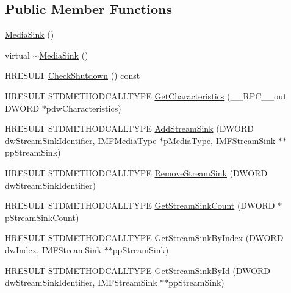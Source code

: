 \subsection*{Public Member Functions}
\begin{DoxyCompactItemize}
\item 
\hyperlink{class_time_stamp_1_1_web_cam_sec_extensions_1_1_media_sink_a26ccc9b7b50079c5fd1309d56a31a088}{Media\+Sink} ()
\item 
virtual \hyperlink{class_time_stamp_1_1_web_cam_sec_extensions_1_1_media_sink_ada06a5ae3a23aa7283f480d4da9e413a}{$\sim$\+Media\+Sink} ()
\item 
H\+R\+E\+S\+U\+LT \hyperlink{class_time_stamp_1_1_web_cam_sec_extensions_1_1_media_sink_a912634cd2c138a78ec02a21ba72b1cea}{Check\+Shutdown} () const
\item 
H\+R\+E\+S\+U\+LT S\+T\+D\+M\+E\+T\+H\+O\+D\+C\+A\+L\+L\+T\+Y\+PE \hyperlink{class_time_stamp_1_1_web_cam_sec_extensions_1_1_media_sink_a4573948e4208bfc947eef15c0d8b72f7}{Get\+Characteristics} (\+\_\+\+\_\+\+R\+P\+C\+\_\+\+\_\+out D\+W\+O\+RD $\ast$pdw\+Characteristics)
\item 
H\+R\+E\+S\+U\+LT S\+T\+D\+M\+E\+T\+H\+O\+D\+C\+A\+L\+L\+T\+Y\+PE \hyperlink{class_time_stamp_1_1_web_cam_sec_extensions_1_1_media_sink_a97556e012a126b54224c4f717c4e2c61}{Add\+Stream\+Sink} (D\+W\+O\+RD dw\+Stream\+Sink\+Identifier, I\+M\+F\+Media\+Type $\ast$p\+Media\+Type, I\+M\+F\+Stream\+Sink $\ast$$\ast$pp\+Stream\+Sink)
\item 
H\+R\+E\+S\+U\+LT S\+T\+D\+M\+E\+T\+H\+O\+D\+C\+A\+L\+L\+T\+Y\+PE \hyperlink{class_time_stamp_1_1_web_cam_sec_extensions_1_1_media_sink_aac74f2dee7ed776bf70ac183ad106966}{Remove\+Stream\+Sink} (D\+W\+O\+RD dw\+Stream\+Sink\+Identifier)
\item 
H\+R\+E\+S\+U\+LT S\+T\+D\+M\+E\+T\+H\+O\+D\+C\+A\+L\+L\+T\+Y\+PE \hyperlink{class_time_stamp_1_1_web_cam_sec_extensions_1_1_media_sink_a18162539f33b88f682dd722ec087c0fd}{Get\+Stream\+Sink\+Count} (D\+W\+O\+RD $\ast$p\+Stream\+Sink\+Count)
\item 
H\+R\+E\+S\+U\+LT S\+T\+D\+M\+E\+T\+H\+O\+D\+C\+A\+L\+L\+T\+Y\+PE \hyperlink{class_time_stamp_1_1_web_cam_sec_extensions_1_1_media_sink_a4ff5dd283336c676cb0976dbefe95a0c}{Get\+Stream\+Sink\+By\+Index} (D\+W\+O\+RD dw\+Index, I\+M\+F\+Stream\+Sink $\ast$$\ast$pp\+Stream\+Sink)
\item 
H\+R\+E\+S\+U\+LT S\+T\+D\+M\+E\+T\+H\+O\+D\+C\+A\+L\+L\+T\+Y\+PE \hyperlink{class_time_stamp_1_1_web_cam_sec_extensions_1_1_media_sink_a971ba135fdb13d2c623cc7c1b890ced3}{Get\+Stream\+Sink\+By\+Id} (D\+W\+O\+RD dw\+Stream\+Sink\+Identifier, I\+M\+F\+Stream\+Sink $\ast$$\ast$pp\+Stream\+Sink)
$$
\end{DoxyCompactItemize}
